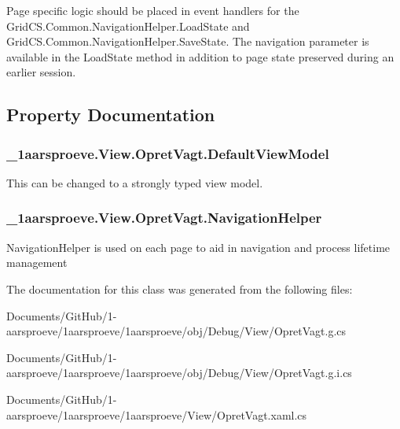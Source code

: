 Page specific logic should be placed in event handlers for the Grid\+C\+S.\+Common.\+Navigation\+Helper.\+Load\+State and Grid\+C\+S.\+Common.\+Navigation\+Helper.\+Save\+State. The navigation parameter is available in the Load\+State method in addition to page state preserved during an earlier session. 

\subsection{Property Documentation}
\hypertarget{class__1aarsproeve_1_1_view_1_1_opret_vagt_a917197c5ec9ec6e45bfe1f8be3b5b544}{}
\subsubsection[{Default\+View\+Model}]{ \+\_\+1aarsproeve.\+View.\+Opret\+Vagt.\+Default\+View\+Model\hspace{0.3cm}{\ttfamily [get]}}\label{class__1aarsproeve_1_1_view_1_1_opret_vagt_a917197c5ec9ec6e45bfe1f8be3b5b544}


This can be changed to a strongly typed view model. 

\hypertarget{class__1aarsproeve_1_1_view_1_1_opret_vagt_ac175e006e267cf062167def039b8860c}{}
\subsubsection[{Navigation\+Helper}]{ \+\_\+1aarsproeve.\+View.\+Opret\+Vagt.\+Navigation\+Helper\hspace{0.3cm}{\ttfamily [get]}}\label{class__1aarsproeve_1_1_view_1_1_opret_vagt_ac175e006e267cf062167def039b8860c}


Navigation\+Helper is used on each page to aid in navigation and process lifetime management 



The documentation for this class was generated from the following files\+:\begin{DoxyCompactItemize}
\item 
Documents/\+Git\+Hub/1-\/aarsproeve/1aarsproeve/1aarsproeve/obj/\+Debug/\+View/Opret\+Vagt.\+g.\+cs\item 
Documents/\+Git\+Hub/1-\/aarsproeve/1aarsproeve/1aarsproeve/obj/\+Debug/\+View/Opret\+Vagt.\+g.\+i.\+cs\item 
Documents/\+Git\+Hub/1-\/aarsproeve/1aarsproeve/1aarsproeve/\+View/Opret\+Vagt.\+xaml.\+cs\end{DoxyCompactItemize}
